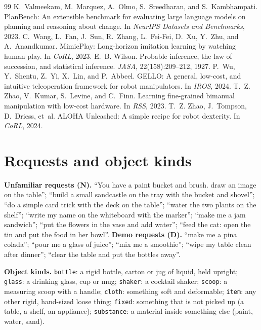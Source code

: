 \documentclass[10pt,twocolumn,letterpaper]{article}
\newcommand{\code}[1]{\texttt{\small #1}}
\begin{document}
\begin{thebibliography}{99}
 K.~Valmeekam, M.~Marquez, A.~Olmo, S.~Sreedharan, and S.~Kambhampati. PlanBench: An extensible benchmark for evaluating large language models on planning and reasoning about change. In \emph{NeurIPS Datasets and Benchmarks}, 2023.
 C.~Wang, L.~Fan, J.~Sun, R.~Zhang, L.~Fei-Fei, D.~Xu, Y.~Zhu, and A.~Anandkumar. MimicPlay: Long-horizon imitation learning by watching human play. In \emph{CoRL}, 2023.
 E.~B. Wilson. Probable inference, the law of succession, and statistical inference. \emph{JASA}, 22(158):209--212, 1927.
 P.~Wu, Y.~Shentu, Z.~Yi, X.~Lin, and P.~Abbeel. GELLO: A general, low-cost, and intuitive teleoperation framework for robot manipulators. In \emph{IROS}, 2024.
 T.~Z. Zhao, V.~Kumar, S.~Levine, and C.~Finn. Learning fine-grained bimanual manipulation with low-cost hardware. In \emph{RSS}, 2023.
 T.~Z. Zhao, J.~Tompson, D.~Driess, et~al. ALOHA Unleashed: A simple recipe for robot dexterity. In \emph{CoRL}, 2024.
\end{thebibliography}
\normalsize

\appendix
\section{Requests and object kinds}\label{app:kinds}
\textbf{Unfamiliar requests (N).} ``You have a paint bucket and brush. draw an image on the table''; ``build a small
sandcastle on the tray with the bucket and shovel''; ``do a simple card trick with the deck on the table''; ``water the
two plants on the shelf''; ``write my name on the whiteboard with the marker''; ``make me a jam sandwich''; ``put the
flowers in the vase and add water''; ``feed the cat: open the tin and put the food in her bowl''. \textbf{Demo requests
(D).} ``make me a pina colada''; ``pour me a glass of juice''; ``mix me a smoothie''; ``wipe my table clean after
dinner''; ``clear the table and put the bottles away''.

\textbf{Object kinds.} \code{bottle}: a rigid bottle, carton or jug of liquid, held upright; \code{glass}: a drinking
glass, cup or mug; \code{shaker}: a cocktail shaker; \code{scoop}: a measuring scoop with a handle; \code{cloth}:
something soft and deformable; \code{item}: any other rigid, hand-sized loose thing; \code{fixed}: something that is
not picked up (a table, a shelf, an appliance); \code{substance}: a material inside something else (paint, water, sand).
\end{document}

